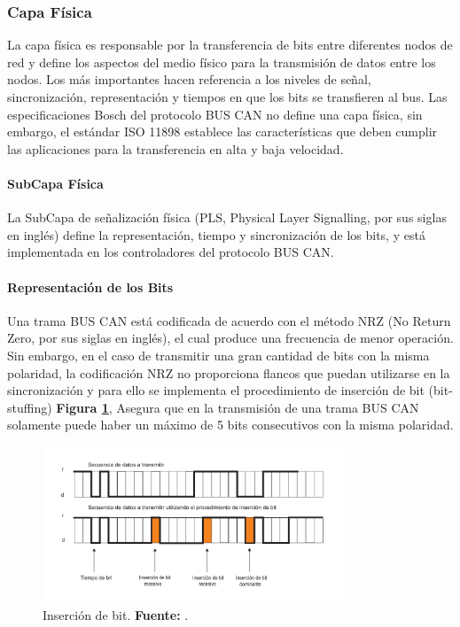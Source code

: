 \subsubsection  {Capa Física}

La capa física es responsable por la transferencia de bits entre diferentes nodos de red y define los aspectos del medio físico para la transmisión de datos entre los nodos. Los más importantes hacen referencia a los niveles de señal, sincronización, representación y tiempos en que los bits se transfieren al bus. 
Las especificaciones Bosch del protocolo BUS CAN no define una capa física, sin embargo, el estándar  ISO 11898 establece las características que deben cumplir las aplicaciones para la transferencia en alta y baja velocidad.
 
\paragraph{SubCapa Física}

La SubCapa de señalización física (PLS, Physical Layer Signalling, por sus siglas en inglés) define la representación, tiempo y sincronización de los bits, y está implementada en los controladores del protocolo BUS CAN.


\paragraph{Representación de los Bits}

Una trama BUS CAN está codificada de acuerdo con el método NRZ (No Return Zero, por sus siglas en inglés), el cual produce una frecuencia de menor operación. Sin embargo, en el caso de transmitir una gran cantidad de bits con la misma polaridad, la codificación NRZ no proporciona flancos que puedan utilizarse en la sincronización y para ello se implementa el procedimiento de inserción de bit (bit-stuffing) \textbf{Figura \ref{IB}}, Asegura que en la transmisión de una trama BUS CAN solamente puede haber un máximo de 5 bits consecutivos con la misma polaridad.



\begin{figure}[H]
	\centering
		\includegraphics[width=0.8\textwidth]{./Cap2imagen/insercionbit.pdf}
	\caption[Inserción de bit.]{Inserción de bit.\textbf{ Fuente:} \cite{DSEEPC}.}
	\label{IB} %
\end{figure}

